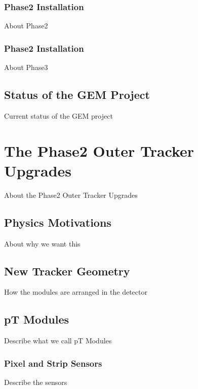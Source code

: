             \subsubsection{Phase2 Installation}

                About Phase2

            \subsubsection{Phase2 Installation}

                About Phase3

        \subsection{Status of the GEM Project}

            Current status of the GEM project

    \section{The Phase2 Outer Tracker Upgrades}

        About the Phase2 Outer Tracker Upgrades

        \subsection{Physics Motivations}

            About why we want this

        \subsection{New Tracker Geometry}

            How the modules are arranged in the detector

        \subsection{pT Modules}

            Describe what we call pT Modules

            \subsubsection{Pixel and Strip Sensors}

                Describe the sensors

